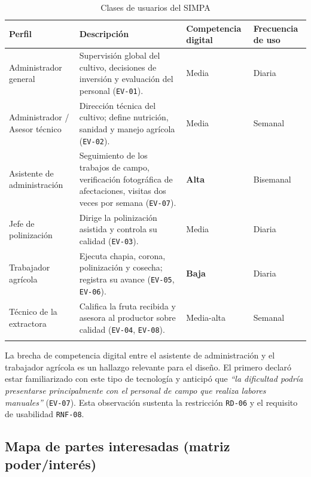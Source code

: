 \documentclass[11pt,a4paper]{article}
\newcommand{\id}[1]{\texttt{\begingroup\hyphenpenalty=10000\relax#1\endgroup}}
\renewcommand{\id}[1]{\texttt{#1}}
\begin{document}
\begin{longtable}{|L{3.0cm}|L{5.4cm}|L{3.2cm}|L{2.8cm}|}
\hline
{}\textbf{Perfil} & \textbf{Descripción} & \textbf{Competencia digital} & \textbf{Frecuencia de uso} \\
\hline
\endhead
Administrador general & Supervisión global del cultivo, decisiones de inversión y evaluación del personal (\id{EV-01}). & Media & Diaria \\ \hline
Administrador / Asesor técnico & Dirección técnica del cultivo; define nutrición, sanidad y manejo agrícola (\id{EV-02}). & Media & Semanal \\ \hline
Asistente de administración & Seguimiento de los trabajos de campo, verificación fotográfica de afectaciones, visitas dos veces por semana (\id{EV-07}). & \textbf{Alta} & Bisemanal \\ \hline
Jefe de polinización & Dirige la polinización asistida y controla su calidad (\id{EV-03}). & Media & Diaria \\ \hline
Trabajador agrícola & Ejecuta chapia, corona, polinización y cosecha; registra su avance (\id{EV-05}, \id{EV-06}). & \textbf{Baja} & Diaria \\ \hline
Técnico de la extractora & Califica la fruta recibida y asesora al productor sobre calidad (\id{EV-04}, \id{EV-08}). & Media-alta & Semanal \\ \hline
\caption{Clases de usuarios del SIMPA}
\end{longtable}

\noindent
La brecha de competencia digital entre el asistente de administración y el trabajador agrícola es
un hallazgo relevante para el diseño. El primero declaró estar familiarizado con este tipo de
tecnología y anticipó que \emph{``la dificultad podría presentarse principalmente con el personal de
campo que realiza labores manuales''} (\id{EV-07}). Esta observación sustenta la restricción
\id{RD-06} y el requisito de usabilidad \id{RNF-08}.

\subsection{Mapa de partes interesadas (matriz poder/interés)}
\end{document}
